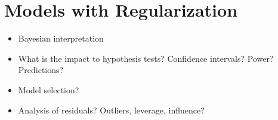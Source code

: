 \documentclass[12pt]{article}
\begin{document}
\section{Models with Regularization}
\label{app:regularization}

\begin{itemize}
\item Bayesian interpretation
\item What is the impact to hypothesis tests? Confidence intervals? Power? Predictions?
\item Model selection?
\item Analysis of residuals? Outliers, leverage, influence?
\end{itemize}

\newpage

\end{document}
